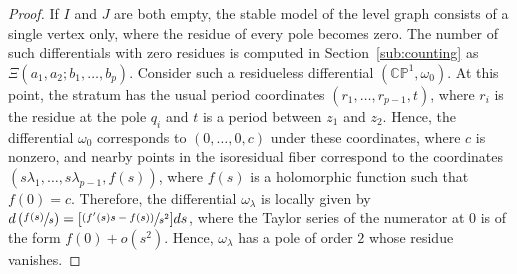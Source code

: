 \documentclass[11pt]{article}
\newcommand{\psfrac}[2]{\sfrac{(#1)}{#2}}
\newcommand{\Bpsfrac}[2]{[\psfrac{#1}{#2}]}
\theoremstyle{definition}
\begin{document}
\begin{proof}
If $I$ and $J$ are both empty, the stable model of the level graph consists of a single vertex only, where the residue of every pole becomes zero. The number of such differentials with zero residues is computed in Section~\ref{sub:counting} as
$\Xi(a_1, a_2; b_1, \ldots, b_p)$. Consider such a residueless differential $(\mathbb{CP}^{1},\omega_{0})$. At this point, the stratum has the usual period coordinates $(r_{1},\dots,r_{p-1},t)$, where $r_{i}$ is the residue at the pole $q_{i}$ and $t$ is a period between $z_{1}$ and $z_{2}$. Hence, the differential $\omega_0$
corresponds to $(0,\dots,0,c)$ under these coordinates, where $c$ is nonzero, and nearby points in the isoresidual fiber correspond to the coordinates $(s\lambda_{1},\dots,s\lambda_{p-1}, f(s))$, where $f(s)$ is a holomorphic function such that $f(0)=c$. Therefore, the differential $\omega_{\lambda}$ is locally given by $d\left(\sfrac{f(s)}{s}\right) = \Bpsfrac{f'(s)s-f(s)}{s^{2}}ds$, where the Taylor series of the numerator at $0$ is of the form $f(0) + o(s^{2})$. Hence, $\omega_\lambda$ has a pole of order $2$ whose residue vanishes.
\end{proof}
\end{document}
